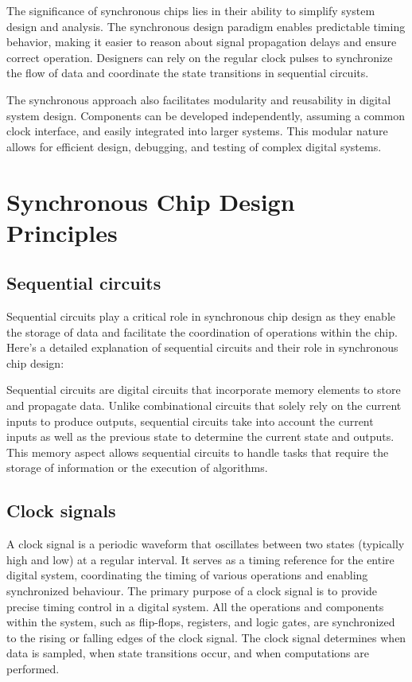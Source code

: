 \documentclass[a4paper,11pt]{report}
\begin{document}
The significance of synchronous chips lies in their ability to simplify system design and analysis. The synchronous design paradigm enables predictable timing behavior, making it easier to reason about signal propagation delays and ensure correct operation. Designers can rely on the regular clock pulses to synchronize the flow of data and coordinate the state transitions in sequential circuits.

The synchronous approach also facilitates modularity and reusability in digital system design. Components can be developed independently, assuming a common clock interface, and easily integrated into larger systems. This modular nature allows for efficient design, debugging, and testing of complex digital systems.
  

  
\chapter{Synchronous Chip Design Principles}

\section{Sequential circuits}
Sequential circuits play a critical role in synchronous chip design as they enable the storage of data and facilitate the coordination of operations within the chip. Here's a detailed explanation of sequential circuits and their role in synchronous chip design:

Sequential circuits are digital circuits that incorporate memory elements to store and propagate data. Unlike combinational circuits that solely rely on the current inputs to produce outputs, sequential circuits take into account the current inputs as well as the previous state to determine the current state and outputs. This memory aspect allows sequential circuits to handle tasks that require the storage of information or the execution of algorithms.
\section{Clock signals}
A clock signal is a periodic waveform that oscillates between two states (typically high and low) at a regular interval. It serves as a timing reference for the entire digital system, coordinating the timing of various operations and enabling synchronized behaviour.
The primary purpose of a clock signal is to provide precise timing control in a digital system. All the operations and components within the system, such as flip-flops, registers, and logic gates, are synchronized to the rising or falling edges of the clock signal. The clock signal determines when data is sampled, when state transitions occur, and when computations are performed.
\end{document}
